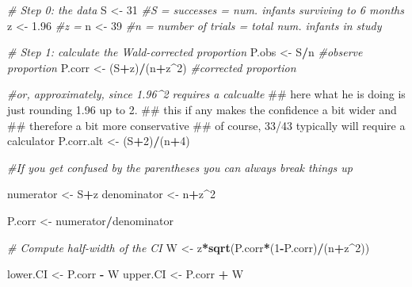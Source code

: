\documentclass[]{book}
\newenvironment{Shaded}{\begin{snugshade}}{\end{snugshade}}
\newcommand{\KeywordTok}[1]{\textcolor[rgb]{0.13,0.29,0.53}{\textbf{#1}}}
\newcommand{\DecValTok}[1]{\textcolor[rgb]{0.00,0.00,0.81}{#1}}
\newcommand{\FloatTok}[1]{\textcolor[rgb]{0.00,0.00,0.81}{#1}}
\newcommand{\StringTok}[1]{\textcolor[rgb]{0.31,0.60,0.02}{#1}}
\newcommand{\CommentTok}[1]{\textcolor[rgb]{0.56,0.35,0.01}{\textit{#1}}}
\newcommand{\OperatorTok}[1]{\textcolor[rgb]{0.81,0.36,0.00}{\textbf{#1}}}
\newcommand{\NormalTok}[1]{#1}
\theoremstyle{definition}
\theoremstyle{definition}
\theoremstyle{definition}
\theoremstyle{remark}
\begin{document}
\begin{Shaded}
\begin{Highlighting}[]
\CommentTok{# Step 0: the data}
\NormalTok{S <-}\StringTok{ }\DecValTok{31}   \CommentTok{#S = successes = num. infants surviving to 6 months}
\NormalTok{z <-}\StringTok{ }\FloatTok{1.96} \CommentTok{#z = }
\NormalTok{n <-}\StringTok{ }\DecValTok{39}   \CommentTok{#n = number of trials = total num. infants in study}

\CommentTok{# Step 1: calculate the Wald-corrected proportion}
\NormalTok{P.obs  <-}\StringTok{  }\NormalTok{S}\OperatorTok{/}\NormalTok{n           }\CommentTok{#observe proportion}
\NormalTok{P.corr <-}\StringTok{  }\NormalTok{(S}\OperatorTok{+}\NormalTok{z)}\OperatorTok{/}\NormalTok{(n}\OperatorTok{+}\NormalTok{z}\OperatorTok{^}\DecValTok{2}\NormalTok{) }\CommentTok{#corrected proportion}

\CommentTok{#or, approximately, since 1.96^2 requires a calcualte}
\NormalTok{## here what he is doing is just rounding 1.96 up to 2.}
\NormalTok{## this if any makes the confidence a bit wider and}
\NormalTok{## therefore a bit more conservative}
\NormalTok{## of course, 33/43 typically will require a calculator}
\NormalTok{P.corr.alt <-}\StringTok{  }\NormalTok{(S}\OperatorTok{+}\DecValTok{2}\NormalTok{)}\OperatorTok{/}\NormalTok{(n}\OperatorTok{+}\DecValTok{4}\NormalTok{)}

\CommentTok{#If you get confused by the parentheses you can always break things up}

\NormalTok{numerator <-}\StringTok{ }\NormalTok{S}\OperatorTok{+}\NormalTok{z}
\NormalTok{denominator <-}\StringTok{ }\NormalTok{n}\OperatorTok{+}\NormalTok{z}\OperatorTok{^}\DecValTok{2}

\NormalTok{P.corr <-}\StringTok{ }\NormalTok{numerator}\OperatorTok{/}\NormalTok{denominator}

\CommentTok{# Compute half-width of the CI}
\NormalTok{W <-}\StringTok{ }\NormalTok{z}\OperatorTok{*}\KeywordTok{sqrt}\NormalTok{(P.corr}\OperatorTok{*}\NormalTok{(}\DecValTok{1}\OperatorTok{-}\NormalTok{P.corr)}\OperatorTok{/}\NormalTok{(n}\OperatorTok{+}\NormalTok{z}\OperatorTok{^}\DecValTok{2}\NormalTok{))}

\NormalTok{lower.CI <-}\StringTok{ }\NormalTok{P.corr }\OperatorTok{-}\StringTok{ }\NormalTok{W}
\NormalTok{upper.CI <-}\StringTok{ }\NormalTok{P.corr }\OperatorTok{+}\StringTok{ }\NormalTok{W}
\end{Highlighting}
\end{Shaded}
\end{document}
